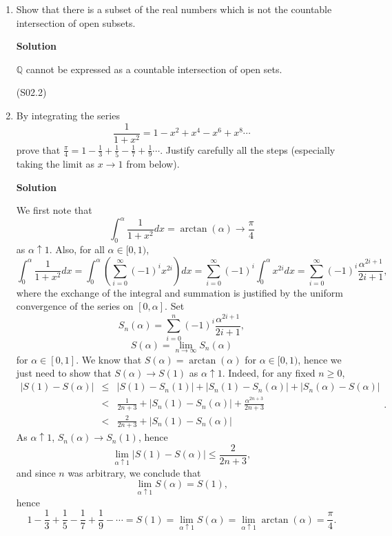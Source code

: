 \documentclass{article}
\begin{document}
\begin{enumerate}
\item Show that there is a subset of the real numbers which is not the countable intersection of open subsets.

{\bf Solution}

\(\mathbb{Q}\) cannot be expressed as a countable intersection of open sets.

(S02.2)



\item By integrating the series
\[\frac{1}{1 + x^2} = 1 - x^2 + x^4 - x^6 + x^8 \cdots\]
prove that \(\frac{\pi}{4} = 1 - \frac{1}{3} + \frac{1}{5} - \frac{1}{7} + \frac{1}{9} \cdots\).  Justify carefully all the steps (especially taking the limit as \(x \to 1\) from below).

{\bf Solution}

We first note that
\[\int_0^{\alpha} \frac{1}{1 + x^2} dx = \arctan(\alpha) \to \frac{\pi}{4}\]
as \(\alpha \uparrow 1\).  Also, for all \(\alpha \in [0,1)\),
\[  \int_0^{\alpha} \frac{1}{1 + x^2} dx
  = \int_0^{\alpha} \left( \sum_{i = 0}^{\infty} (-1)^i x^{2i} \right) dx
  = \sum_{i = 0}^{\infty} (-1)^i \int_0^{\alpha} x^{2i} dx
  = \sum_{i = 0}^{\infty} (-1)^i \frac{\alpha^{2i + 1}}{2i + 1},\]
where the exchange of the integral and summation is justified by the uniform convergence of the series on \([0, \alpha]\).  Set
\[S_n(\alpha) = \sum_{i = 0}^n (-1)^i \frac{\alpha^{2i + 1}}{2i + 1},\]
\[S(\alpha) = \lim_{n \to \infty} S_n(\alpha)\]
for \(\alpha \in [0,1]\).  We know that \(S(\alpha) = \arctan(\alpha)\) for \(\alpha \in [0,1)\), hence we just need to show that \(S(\alpha) \to S(1)\) as \(\alpha \uparrow 1\).  Indeed, for any fixed \(n \geq 0\),
\[\begin{array}{rcl}
  |S(1) - S(\alpha)|
  & \leq & |S(1) - S_n(1)| + |S_n(1) - S_n(\alpha)| + |S_n(\alpha) - S(\alpha)| \\
  &    < & \frac{1}{2n + 3} + |S_n(1) - S_n(\alpha)| + \frac{\alpha^{2n + 3}}{2n + 3} \\
  &    < & \frac{2}{2n + 3} + |S_n(1) - S_n(\alpha)|
  \end{array}.\]
As \(\alpha \uparrow 1\), \(S_n(\alpha) \to S_n(1)\), hence
\[\lim_{\alpha \uparrow 1} |S(1) - S(\alpha)| \leq \frac{2}{2n + 3},\]
and since \(n\) was arbitrary, we conclude that
\[\lim_{\alpha \uparrow 1} S(\alpha) = S(1),\]
hence
\[1 - \frac{1}{3} + \frac{1}{5} - \frac{1}{7} + \frac{1}{9} - \cdots = S(1) = \lim_{\alpha \uparrow 1} S(\alpha) = \lim_{\alpha \uparrow 1} \arctan(\alpha) = \frac{\pi}{4}.\]




\end{enumerate}
\end{document}
